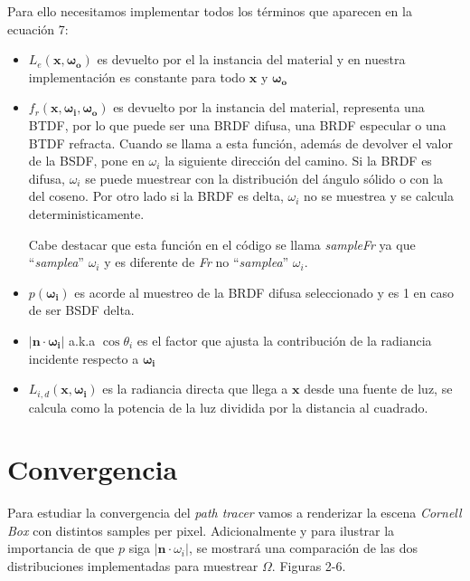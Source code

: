 \documentclass{article}
\begin{document}
Para ello necesitamos implementar todos los términos que aparecen en la ecuación
7:

\begin{itemize}
  \item \(L_e(\mathbf{x}, \mathbf{\omega_{o}})\) es devuelto por el la instancia
        del material y en nuestra implementación es constante para todo
        \(\mathbf{x}\) y \(\mathbf{\omega_{o}}\)
  \item \(f_r(\mathbf{x}, \mathbf{\omega_{i}}, \mathbf{\omega_{o}}) \) es
        devuelto por la instancia del material, representa una BTDF, por lo que
        puede ser una BRDF difusa, una BRDF especular o una BTDF refracta. Cuando
        se llama a esta función, además de devolver el valor de la BSDF, pone en
        \(\omega_{i}\) la siguiente dirección del camino. Si la BRDF es difusa,
        \(\omega_{i}\) se puede muestrear con la distribución del ángulo sólido
        o con la del coseno. Por otro lado si la BRDF es delta, \(\omega_{i}\)
        no se muestrea y se calcula deterministicamente.

        Cabe destacar que esta función en el código se llama \textit{sampleFr}
        ya que ``\textit{samplea}'' \(\omega_{i}\) y es diferente de \textit{Fr}
        no ``\textit{samplea}'' \(\omega_{i}\).
  \item \(p(\mathbf{\omega_{i}})\) es acorde al muestreo de la BRDF difusa
        seleccionado y es 1 en caso de ser BSDF delta.
  \item \(|\mathbf{n} \cdot \mathbf{\omega_{i}}|\) a.k.a \(\cos\theta_{i}\) es
        el factor que ajusta la contribución de la radiancia incidente respecto
        a \(\mathbf{\omega_{i}}\)
  \item \(L_{i,d}(\mathbf{x}, \mathbf{\omega_{i}})\) es la radiancia directa que
        llega a \(\mathbf{x}\) desde una fuente de luz, se calcula como la
        potencia de la luz dividida por la distancia al cuadrado.
\end{itemize}

\section{Convergencia}

Para estudiar la convergencia del \textit{path tracer} vamos a renderizar la
escena \textit{Cornell Box} con distintos samples per pixel. Adicionalmente y
para ilustrar la importancia de que \(p\) siga \(|\mathbf{n}\cdot \omega_{i}|\),
se mostrará una comparación de las dos distribuciones implementadas para
muestrear \(\Omega\). Figuras 2-6.
\end{document}
